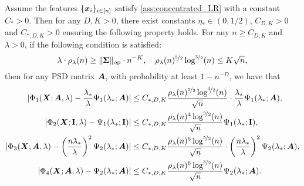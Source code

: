 \begin{theorem}\label{thm:main_det_equiv_summary}
    Assume the features $\{{\boldsymbol x}_i\}_{i \in [n]}$ satisfy \cref{ass:concentrated_LR} with a constant $C_* > 0$. Then for any $D, K > 0$, there exist constants $\eta_* \in (0, 1/2)$, $C_{D, K} > 0$ and $C_{*, D, K} > 0$ ensuring the following property holds. For any $n \geq C_{D, K}$ and $\lambda > 0$, if the following condition is satisfied:
    \begin{equation}\label{eq:conditions_det_equiv_main}
        \lambda \cdot \rho_{\lambda}(n) \geq \|\bm{\Sigma}\|_{\mathrm{op}} \cdot n^{-K}, \quad \rho_{\lambda}(n)^{\nicefrac{5}{2}} \log^{\nicefrac{3}{2}}(n) \leq K \sqrt{n},
    \end{equation}
    then for any PSD matrix ${\boldsymbol A}$, with probability at least $1 - n^{-D}$, we have that
    \begin{align}
        |\Phi_1({\boldsymbol X}; {\boldsymbol A}, \lambda) - \frac{\lambda_*}{\lambda} \Psi_1(\lambda_*; {\boldsymbol A})| &\leq C_{*, D, K} \frac{\rho_{\lambda}(n)^{\nicefrac{5}{2}} \log^{\nicefrac{3}{2}}(n)}{\sqrt{n}} \cdot \frac{\lambda_*}{\lambda} \Psi_1(\lambda_*; {\boldsymbol A}),\label{eq:det_equiv_phi1_main}\\
        |\Phi_2({\boldsymbol X}; {\mathbf I}, \lambda) - \Psi_1(\lambda_*; {\mathbf I})| &\leq C_{*, D, K} \frac{\rho_{\lambda}(n)^4 \log^{\nicefrac{3}{2}}(n)}{\sqrt{n}} \Psi_1(\lambda_*; {\mathbf I}),\label{eq:det_equiv_phi2_main}\\
        |\Phi_3({\boldsymbol X}; {\boldsymbol A}, \lambda) - \left(\frac{n \lambda_*}{\lambda}\right)^2 \Psi_2(\lambda_*; {\boldsymbol A})| &\leq C_{*, D, K} \frac{\rho_{\lambda}(n)^6 \log^{\nicefrac{5}{2}}(n)}{\sqrt{n}} \cdot \left(\frac{n \lambda_*}{\lambda}\right)^2 \Psi_2(\lambda_*; {\boldsymbol A}),\label{eq:det_equiv_phi3_main}\\
        |\Phi_4({\boldsymbol X}; {\boldsymbol A}, \lambda) - \Psi_2(\lambda_*; {\boldsymbol A})| &\leq C_{*, D, K} \frac{\rho_{\lambda}(n)^6 \log^{\nicefrac{3}{2}}(n)}{\sqrt{n}} \Psi_2(\lambda_*; {\boldsymbol A}).\label{eq:det_equiv_phi4_main}
    \end{align}
\end{theorem}


